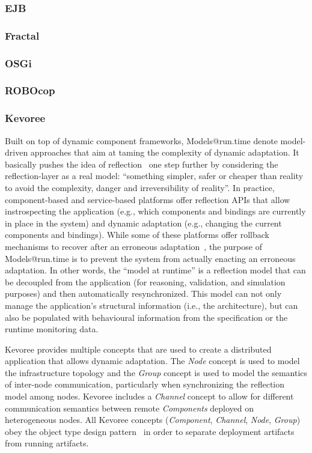 \subsubsection{EJB}
\subsubsection{Fractal}
\subsubsection{OSGi}
\subsubsection{ROBOcop}
\subsubsection{Kevoree}

Built on top of dynamic component frameworks, Models@run.time denote model-driven approaches that aim at taming the complexity of dynamic adaptation.
It basically pushes the idea of reflection~\cite{morin09a} one step further by considering the reflection-layer as a real model: ``something simpler, safer or cheaper than reality to avoid the complexity, danger and irreversibility of reality''.
In practice, component-based and service-based platforms offer reflection APIs that allow instrospecting the application (e.g., which components and bindings are currently in place in the system) and dynamic adaptation (e.g., changing the current components and bindings).
While some of these platforms offer rollback mechanisms to recover after an erroneous adaptation~\cite{leger2010reliable}, the purpose of Models@run.time is to prevent the system from actually enacting an erroneous adaptation. 
In other words, the ``model at runtime'' is a reflection model that can be decoupled from the application (for reasoning, validation, and simulation purposes) and then automatically resynchronized.
This model can not only manage the application's structural information (i.e., the architecture), but can also be populated with behavioural information from the specification or the runtime monitoring data.

Kevoree provides multiple concepts that are used to create a distributed application that allows dynamic adaptation. The \emph{Node} concept is used to model the infrastructure topology and the \emph{Group} concept is used to model the semantics of inter-node communication, particularly when synchronizing the reflection model among nodes. 
Kevoree includes a \emph{Channel} concept to allow for different communication semantics between remote \emph{Components} deployed on heterogeneous nodes. 
All Kevoree concepts (\textit{Component}, \textit{Channel}, \textit{Node}, \textit{Group}) obey the object type design pattern~\cite{johnson_type_1997} in order to separate deployment artifacts from running artifacts.  

